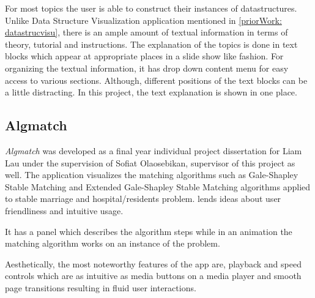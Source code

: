 For most topics the user is able to construct their instances of datastructures.
Unlike Data Structure Visualization application mentioned in
\autoref{priorWork: datastrucvisu}, there is an ample amount of textual
information in terms of theory, tutorial and instructions. The explanation of
the topics is done in text blocks which appear at appropriate places in a slide
show like fashion. For organizing the textual information, it has drop down
content menu for easy access to various sections. Although, different positions
of the text blocks can be a little distracting. In this project, the text explanation
is shown in one place.


\subsection{Algmatch}
\label{priorWork: algmatch}
\emph{Algmatch} was developed as a final year individual project dissertation for
Liam Lau under the supervision of Sofiat Olaosebikan, supervisor of this project as well. The application
visualizes the matching algorithms such as Gale-Shapley Stable Matching and
Extended Gale-Shapley Stable Matching algorithms applied to stable marriage and
hospital/residents problem. \cite{LiamApp}
lends ideas about user friendliness and intuitive usage.

It has a panel which describes the algorithm steps while in an animation the
matching algorithm works on an instance of the problem.

Aesthetically, the most noteworthy features of the app are, playback and speed
controls which are as intuitive as media buttons on a media player and smooth
page transitions resulting in fluid user interactions.
